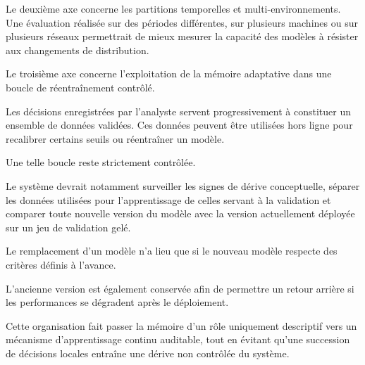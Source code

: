 Le deuxième axe concerne les partitions temporelles et multi-environnements. Une évaluation réalisée sur des périodes différentes, sur plusieurs machines ou sur plusieurs réseaux permettrait de mieux mesurer la capacité des modèles à résister aux changements de distribution.

Le troisième axe concerne l'exploitation de la mémoire adaptative dans une boucle de réentraînement contrôlé.

Les décisions enregistrées par l'analyste servent progressivement à constituer un ensemble de données validées. Ces données peuvent être utilisées hors ligne pour recalibrer certains seuils ou réentraîner un modèle.

Une telle boucle reste strictement contrôlée.

Le système devrait notamment surveiller les signes de dérive conceptuelle, séparer les données utilisées pour l'apprentissage de celles servant à la validation et comparer toute nouvelle version du modèle avec la version actuellement déployée sur un jeu de validation gelé.

Le remplacement d'un modèle n'a lieu que si le nouveau modèle respecte des critères définis à l'avance.

L'ancienne version est également conservée afin de permettre un retour arrière si les performances se dégradent après le déploiement.

Cette organisation fait passer la mémoire d'un rôle uniquement descriptif vers un mécanisme d'apprentissage continu auditable, tout en évitant qu'une succession de décisions locales entraîne une dérive non contrôlée du système.
